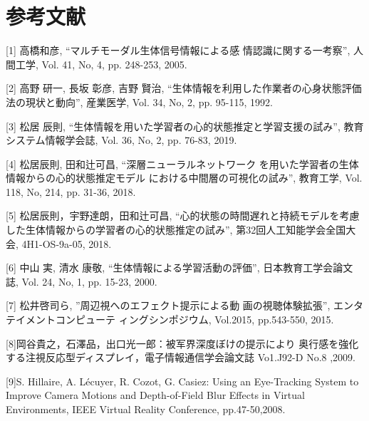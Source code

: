 \chapter*{参考文献}

[1] 高橋和彦, “マルチモーダル生体信号情報による感 情認識に関する一考察”, 人間工学, Vol. 41, No, 4, pp. 248-253, 2005.

[2] 高野 研一, 長坂 彰彦, 吉野 賢治, “生体情報を利用した作業者の心身状態評価法の現状と動向”, 産業医学, Vol. 34, No, 2, pp. 95-115, 1992.

[3] 松居 辰則, “生体情報を用いた学習者の心的状態推定と学習支援の試み”, 教育システム情報学会誌, Vol. 36, No, 2, pp. 76-83, 2019.

[4] 松居辰則, 田和辻可昌, “深層ニューラルネットワーク を用いた学習者の生体情報からの心的状態推定モデル における中間層の可視化の試み”, 教育工学, Vol. 118, No, 214, pp. 31-36, 2018.

[5] 松居辰則，宇野達朗，田和辻可昌, “心的状態の時間遅れと持続モデルを考慮した生体情報からの学習者の心的状態推定の試み”, 第32回人工知能学会全国大会, 4H1-OS-9a-05, 2018.

[6] 中山 実, 清水 康敬, “生体情報による学習活動の評価”, 日本教育工学会論文誌, Vol. 24, No, 1, pp. 15-23, 2000.

[7] 松井啓司ら, ”周辺視へのエフェクト提示による動 画の視聴体験拡張”, エンタテイメントコンピューテ ィングシンポジウム, Vol.2015, pp.543-550, 2015. 

[8]岡谷貴之，石澤品，出口光一郎：被军界深度ぼけの提示により 奥行感を強化する注視反応型ディスプレイ，電子情報通信学会論文誌 Vo1.J92-D No.8 ,2009.

[9]S. Hillaire, A. Lécuyer, R. Cozot, G. Casiez: Using an Eye-Tracking System to Improve Camera Motions and Depth-of-Field Blur Effects in Virtual Environments, IEEE Virtual Reality Conference, pp.47-50,2008.
